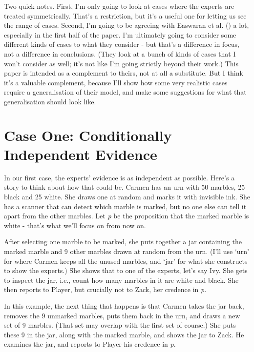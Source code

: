 \documentclass[
  10pt,
  letterpaper,
  DIV=11,
  numbers=noendperiod,
  twoside]{scrartcl}
\begin{document}
Two quick notes. First, I'm only going to look at cases where the
experts are treated symmetrically. That's a restriction, but it's a
useful one for letting us see the range of cases. Second, I'm going to
be agreeing with Easwaran et al. ()
a lot, especially in the first half of the paper. I'm ultimately going
to consider some different kinds of cases to what they consider - but
that's a difference in focus, not a difference in conclusions. (They
look at a bunch of kinds of cases that I won't consider as well; it's
not like I'm going strictly beyond their work.) This paper is intended
as a complement to theirs, not at all a substitute. But I think it's a
valuable complement, because I'll show how some very realistic cases
require a generalisation of their model, and make some suggestions for
what that generalisation should look like.

\section{Case One: Conditionally Independent
Evidence}\label{case-one-conditionally-independent-evidence}

In our first case, the experts' evidence is as independent as possible.
Here's a story to think about how that could be. Carmen has an urn with
50 marbles, 25 black and 25 white. She draws one at random and marks it
with invisible ink. She has a scanner that can detect which marble is
marked, but no one else can tell it apart from the other marbles. Let
\emph{p} be the proposition that the marked marble is white - that's
what we'll focus on from now on.

After selecting one marble to be marked, she puts together a jar
containing the marked marble and 9 other marbles drawn at random from
the urn. (I'll use `urn' for where Carmen keeps all the unused marbles,
and `jar' for what she constructs to show the experts.) She shows that
to one of the experts, let's say Ivy. She gets to inspect the jar, i.e.,
count how many marbles in it are white and black. She then reports to
Player, but crucially not to Zack, her credence in \emph{p}.

In this example, the next thing that happens is that Carmen takes the
jar back, removes the 9 unmarked marbles, puts them back in the urn, and
draws a new set of 9 marbles. (That set may overlap with the first set
of course.) She puts these 9 in the jar, along with the marked marble,
and shows the jar to Zack. He examines the jar, and reports to Player
his credence in \emph{p}.
\end{document}
